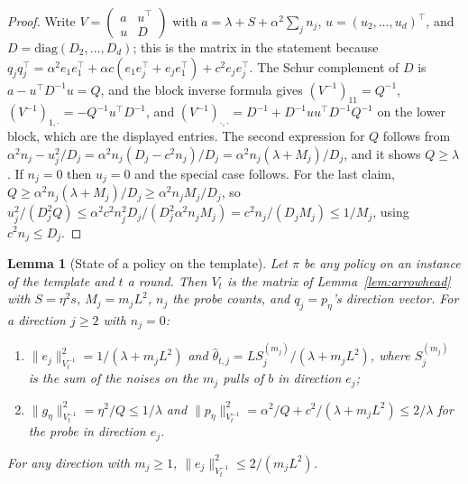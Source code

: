 \documentclass{article}
\newtheorem{lemma}{Lemma}
\theoremstyle{definition}
\theoremstyle{remark}
\theoremstyle{remark}
\begin{document}
\begin{proof}
Write $V=\begin{pmatrix}a&u^\top\\ u&D\end{pmatrix}$ with
$a=\lambda+S+\alpha^2\sum_jn_j$, $u=(u_2,\dots,u_d)^\top$, and
$D=\mathrm{diag}(D_2,\dots,D_d)$; this is the matrix in the statement because
$q_jq_j^\top=\alpha^2e_1e_1^\top+\alpha c(e_1e_j^\top+e_je_1^\top)+c^2e_je_j^\top$.
The Schur complement of $D$ is $a-u^\top D^{-1}u=Q$, and the block inverse
formula gives
$(V^{-1})_{11}=Q^{-1}$, $(V^{-1})_{1,\cdot}=-Q^{-1}u^\top D^{-1}$, and
$(V^{-1})_{\cdot,\cdot}=D^{-1}+D^{-1}uu^\top D^{-1}Q^{-1}$ on the lower block,
which are the displayed entries. The second expression for $Q$ follows from
$\alpha^2n_j-u_j^2/D_j=\alpha^2n_j(D_j-c^2n_j)/D_j=\alpha^2n_j(\lambda+M_j)/D_j$,
and it shows $Q\ge\lambda$. If $n_j=0$ then $u_j=0$ and the special case
follows. For the last claim, $Q\ge\alpha^2n_j(\lambda+M_j)/D_j\ge\alpha^2n_jM_j/D_j$,
so $u_j^2/(D_j^2Q)\le\alpha^2c^2n_j^2D_j/(D_j^2\alpha^2n_jM_j)=c^2n_j/(D_jM_j)\le1/M_j$,
using $c^2n_j\le D_j$.
\end{proof}

\begin{lemma}[State of a policy on the template]
\label{lem:cat-state}
Let $\pi$ be any policy on an instance of the template and $t$ a round. Then
$V_t$ is the matrix of Lemma~\ref{lem:arrowhead} with $S=\eta^2s$, $M_j=m_jL^2$,
$n_j$ the probe counts, and $q_j=p_\eta$'s direction vector. For a direction
$j\ge2$ with $n_j=0$:
\begin{enumerate}[itemsep=1pt,topsep=1pt,leftmargin=*]
\item[(a)] $\|e_j\|^2_{V_t^{-1}}=1/(\lambda+m_jL^2)$ and
$\widehat\theta_{t,j}=LS_j^{(m_j)}/(\lambda+m_jL^2)$, where $S_j^{(m_j)}$ is the
sum of the noises on the $m_j$ pulls of $b$ in direction $e_j$;
\item[(b)] $\|g_\eta\|^2_{V_t^{-1}}=\eta^2/Q\le1/\lambda$ and
$\|p_\eta\|^2_{V_t^{-1}}=\alpha^2/Q+c^2/(\lambda+m_jL^2)\le2/\lambda$ for the probe
in direction $e_j$.
\end{enumerate}
For any direction with $m_j\ge1$, $\|e_j\|^2_{V_t^{-1}}\le2/(m_jL^2)$.
\end{lemma}
\end{document}
